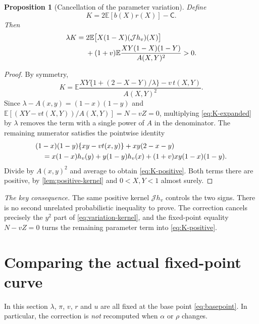 \documentclass[11pt,a4paper]{article}
\numberwithin{equation}{section}
\theoremstyle{notethm}
\newtheorem{proposition}[proposition]{Proposition}
\theoremstyle{definition}
\newcommand{\E}{\mathbb E}
\newcommand{\cJ}{\mathcal J}
\begin{document}
\begin{proposition}[Cancellation of the parameter variation]\label{prop:cancel-parameter}
Define
\begin{equation}\label{eq:K}
 K=2\E[b(X)r(X)]-\mathsf C.
\end{equation}
Then
\begin{align}
 \lambda K
 ={}&2\E\bigl[X(1-X)(\cJ h_v)(X)\bigr]\notag\\
 &+(1+v)\E\frac{XY(1-X)(1-Y)}{A(X,Y)^2}>0.
 \label{eq:K-positive}
\end{align}
\end{proposition}

\begin{proof}
By symmetry,
\begin{equation}\label{eq:K-expanded}
 K=\E\frac{XY\{1+(2-X-Y)/\lambda\}-v\,t(X,Y)}{A(X,Y)^2}.
\end{equation}
Since $\lambda-A(x,y)=(1-x)(1-y)$ and
$\E[(XY-vt(X,Y))/A(X,Y)]=N-vZ=0$, multiplying
\eqref{eq:K-expanded} by $\lambda$ removes the term with a single power
of $A$ in the denominator. The remaining numerator satisfies the pointwise
identity
\begin{align}
 &(1-x)(1-y)\{xy-vt(x,y)\}+xy(2-x-y)\notag\\
 &\quad=x(1-x)h_v(y)+y(1-y)h_v(x)
             +(1+v)xy(1-x)(1-y).\label{eq:pointwise-K}
\end{align}
Divide by $A(x,y)^2$ and average to obtain \eqref{eq:K-positive}.
Both terms there are positive, by \cref{lem:positive-kernel} and
$0<X,Y<1$ almost surely.
\end{proof}

\noindent\emph{The key consequence.}
The same positive kernel $\cJ h_v$ controls the two signs. There is no second
unrelated probabilistic inequality to prove. The correction cancels precisely
the $y^2$ part of \eqref{eq:variation-kernel}, and the fixed-point equality
$N-vZ=0$ turns the remaining parameter term into \eqref{eq:K-positive}.

\section{Comparing the actual fixed-point curve}\label{sec:comparison}

In this section $\lambda$, $\pi$, $v$, $r$ and $u$ are all fixed at the
base point \eqref{eq:basepoint}. In particular, the correction is \emph{not}
recomputed when $\alpha$ or $\rho$ changes.
\end{document}
